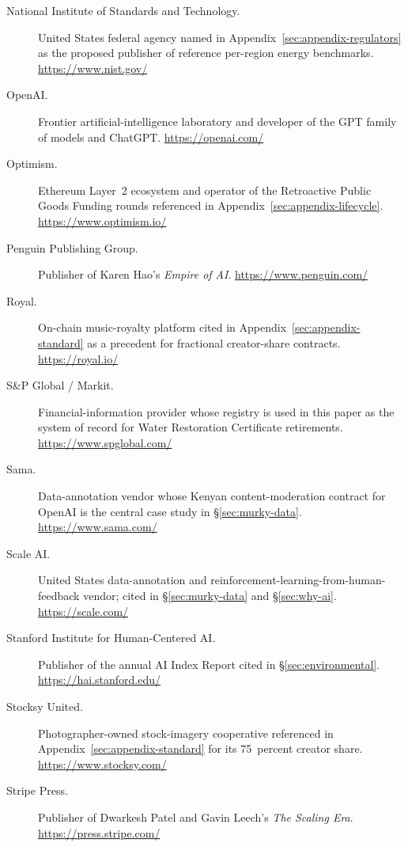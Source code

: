 \documentclass[10pt,a4paper,twocolumn]{article}
\begin{document}
\begin{description}
\item[National Institute of Standards and Technology.] United States federal agency named in Appendix~\ref{sec:appendix-regulators} as the proposed publisher of reference per-region energy benchmarks. \url{https://www.nist.gov/}

\item[OpenAI.] Frontier artificial-intelligence laboratory and developer of the GPT family of models and ChatGPT. \url{https://openai.com/}

\item[Optimism.] Ethereum Layer~2 ecosystem and operator of the Retroactive Public Goods Funding rounds referenced in Appendix~\ref{sec:appendix-lifecycle}. \url{https://www.optimism.io/}

\item[Penguin Publishing Group.] Publisher of Karen Hao's \emph{Empire of AI}. \url{https://www.penguin.com/}

\item[Royal.] On-chain music-royalty platform cited in Appendix~\ref{sec:appendix-standard} as a precedent for fractional creator-share contracts. \url{https://royal.io/}

\item[S\&P Global / Markit.] Financial-information provider whose registry is used in this paper as the system of record for Water Restoration Certificate retirements. \url{https://www.spglobal.com/}

\item[Sama.] Data-annotation vendor whose Kenyan content-moderation contract for OpenAI is the central case study in \S\ref{sec:murky-data}. \url{https://www.sama.com/}

\item[Scale AI.] United States data-annotation and reinforcement-learning-from-human-feedback vendor; cited in \S\ref{sec:murky-data} and \S\ref{sec:why-ai}. \url{https://scale.com/}

\item[Stanford Institute for Human-Centered AI.] Publisher of the annual AI Index Report cited in \S\ref{sec:environmental}. \url{https://hai.stanford.edu/}

\item[Stocksy United.] Photographer-owned stock-imagery cooperative referenced in Appendix~\ref{sec:appendix-standard} for its 75~percent creator share. \url{https://www.stocksy.com/}

\item[Stripe Press.] Publisher of Dwarkesh Patel and Gavin Leech's \emph{The Scaling Era}. \url{https://press.stripe.com/}


\end{description}
\end{document}
